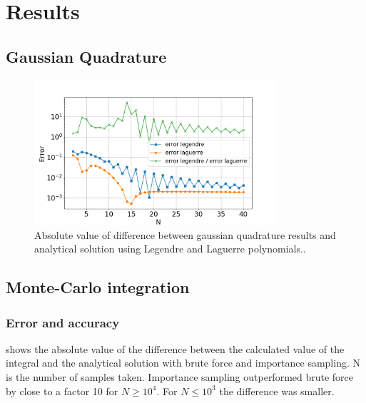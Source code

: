 \section{Results}

\subsection{Gaussian Quadrature}

\begin{figure}[H]
  \centering
  \includegraphics[width=0.8\textwidth]{../figures/gauss_error.png}
  \caption{Absolute value of difference between gaussian quadrature results and analytical
  solution using Legendre and Laguerre polynomials..}

  \label{fig:gauss_error}
\end{figure}


\subsection{Monte-Carlo integration}

\subsubsection{Error and accuracy}

 shows the absolute value of the difference between the
calculated value of the integral and the analytical solution with brute force
and importance sampling. N is the number of samples taken.
Importance sampling outperformed brute force by close to a factor 10 for $N \geq 10^4$.
For $N \leq 10^3$ the difference was smaller.

